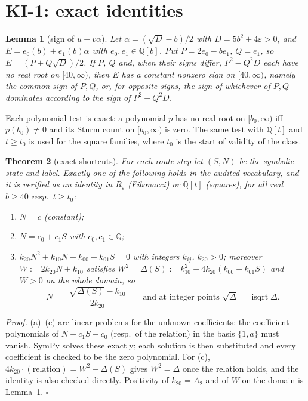\documentclass[11pt]{article}
\newtheorem{theorem}{Theorem}
\newtheorem{lemma}[theorem]{Lemma}
\theoremstyle{definition}
\theoremstyle{remark}
\newcommand{\Q}{\mathbb{Q}}
\DeclareMathOperator{\isqrt}{isqrt}
\begin{document}
\section{KI-1: exact identities}\label{sec:ki1}
\begin{lemma}[sign of $u+v\alpha$]\label{lem:sign}
Let $\alpha=(\sqrt D-b)/2$ with $D=5b^2+4\varepsilon>0$, and $E=e_0(b)+e_1(b)\alpha$ with $e_0,e_1\in\Q[b]$. Put $P=2e_0-be_1$, $Q=e_1$, so $E=(P+Q\sqrt D)/2$. If $P$, $Q$ and, when their signs differ, $P^2-Q^2D$ each have no real root on $[40,\infty)$, then $E$ has a constant nonzero sign on $[40,\infty)$, namely the common sign of $P,Q$, or, for opposite signs, the sign of whichever of $P,Q$ dominates according to the sign of $P^2-Q^2D$.
\end{lemma}
Each polynomial test is exact: a polynomial $p$ has no real root on $[b_0,\infty)$ iff $p(b_0)\neq 0$ and its Sturm count on $[b_0,\infty)$ is zero. The same test with $\Q[t]$ and $t\ge t_0$ is used for the square families, where $t_0$ is the start of validity of the class.

\begin{theorem}[exact shortcuts]\label{thm:ki1}
For each route step let $(S,N)$ be the symbolic state and label. Exactly one of the following holds in the audited vocabulary, and it is verified as an identity in $R_\varepsilon$ (Fibonacci) or $\Q[t]$ (squares), for all real $b\ge 40$ resp.\ $t\ge t_0$:
\begin{enumerate}[label=(\alph*),itemsep=1pt]
\item $N=c$ (constant);
\item $N=c_0+c_1S$ with $c_0,c_1\in\Q$;
\item $k_{20}N^2+k_{10}N+k_{00}+k_{01}S=0$ with integers $k_{ij}$, $k_{20}>0$; moreover $W:=2k_{20}N+k_{10}$ satisfies $W^2=\Delta(S):=k_{10}^2-4k_{20}(k_{00}+k_{01}S)$ and $W>0$ on the whole domain, so
\[ N\;=\;\frac{\sqrt{\Delta(S)}-k_{10}}{2k_{20}}\qquad\text{and at integer points }\sqrt{\Delta}=\isqrt\Delta. \]
\end{enumerate}
\end{theorem}
\emph{Proof.} (a)--(c) are linear problems for the unknown coefficients: the coefficient polynomials of $N-c_1S-c_0$ (resp.\ of the relation) in the basis $\{1,a\}$ must vanish. SymPy solves these exactly; each solution is then substituted and every coefficient is checked to be the zero polynomial. For (c), $4k_{20}\cdot(\text{relation})=W^2-\Delta(S)$ gives $W^2=\Delta$ once the relation holds, and the identity is also checked directly. Positivity of $k_{20}=A_2$ and of $W$ on the domain is Lemma~\ref{lem:sign}. \hfill$\square$
\end{document}
